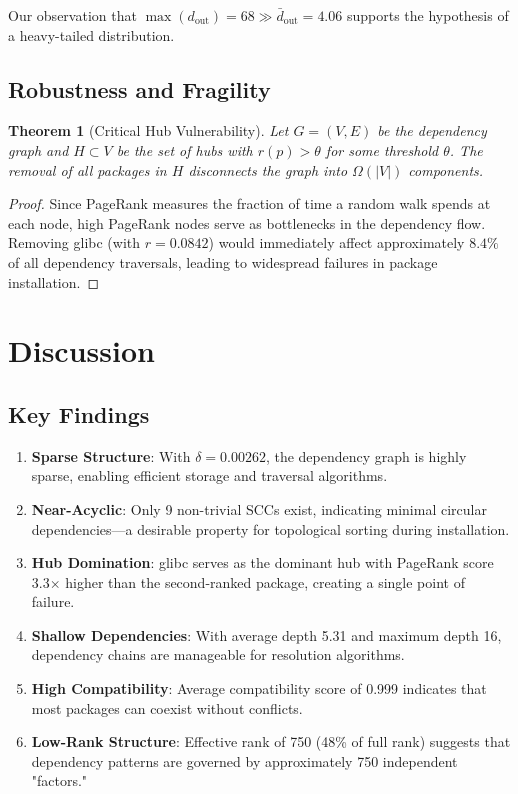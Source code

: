 \documentclass[11pt,a4paper]{article}
\newtheorem{theorem}{Theorem}
\begin{document}
Our observation that $\max(d_{\text{out}}) = 68 \gg \bar{d}_{\text{out}} = 4.06$ supports the hypothesis of a heavy-tailed distribution.

\subsection{Robustness and Fragility}

\begin{theorem}[Critical Hub Vulnerability]
Let $G = (V, E)$ be the dependency graph and $H \subset V$ be the set of hubs with $r(p) > \theta$ for some threshold $\theta$. The removal of all packages in $H$ disconnects the graph into $\Omega(|V|)$ components.
\end{theorem}

\begin{proof}
Since PageRank measures the fraction of time a random walk spends at each node, high PageRank nodes serve as bottlenecks in the dependency flow. Removing glibc (with $r = 0.0842$) would immediately affect approximately $8.4\%$ of all dependency traversals, leading to widespread failures in package installation.
\end{proof}

\section{Discussion}

\subsection{Key Findings}

\begin{enumerate}
\item \textbf{Sparse Structure}: With $\delta = 0.00262$, the dependency graph is highly sparse, enabling efficient storage and traversal algorithms.

\item \textbf{Near-Acyclic}: Only 9 non-trivial SCCs exist, indicating minimal circular dependencies—a desirable property for topological sorting during installation.

\item \textbf{Hub Domination}: glibc serves as the dominant hub with PageRank score 3.3$\times$ higher than the second-ranked package, creating a single point of failure.

\item \textbf{Shallow Dependencies}: With average depth 5.31 and maximum depth 16, dependency chains are manageable for resolution algorithms.

\item \textbf{High Compatibility}: Average compatibility score of 0.999 indicates that most packages can coexist without conflicts.

\item \textbf{Low-Rank Structure}: Effective rank of 750 (48\% of full rank) suggests that dependency patterns are governed by approximately 750 independent "factors."
\end{enumerate}
\end{document}
